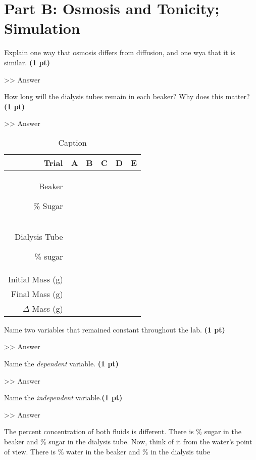 \documentclass[12pt,a4paper]{article}
\begin{document}
\section*{Part B: Osmosis and Tonicity; Simulation}
\begin{enumerate}[font=\bfseries, wide, resume]
    {\color{under}\item Explain one way that osmosis differs from diffusion, and one wya that it is similar. \textbf{(1 pt)}}

    >> Answer

    {\color{under}\item How long will the dialysis tubes remain in each beaker? Why does this matter? \textbf{(1 pt)}}

    >> Answer

    \begin{table}[h]
        \centering
        \caption{Caption}
        \begin{tabular}{r|ccccc}
            \toprule
            Trial & A & B & C & D & E\\
            \midrule
            Beaker \par \% Sugar &&&&\\
            Dialysis Tube\par \% sugar&&&&\\
            Initial Mass (g)&&&&\\
            Final Mass (g) &&&&\\
            $\Delta$ Mass (g)&&&&\\
            \bottomrule
            \end{tabular}
    \end{table}
    

    {\color{under}\item Name two variables that remained constant throughout the lab. \textbf{(1 pt)}}

    >> Answer

    {\color{under}\item Name the \textit{dependent} variable. \textbf{(1 pt)}}

    >> Answer

    {\color{under}\item Name the \textit{independent} variable.\textbf{(1 pt)}}

    >> Answer

    {\color{under} The percent concentration of both fluids is different. There is {\color{darkmodetext}\textbf{}\%} sugar in the beaker and {\color{darkmodetext}\textbf{}\%} sugar in the dialysis tube. Now, think of it from the water's point of  view. There is {\color{darkmodetext}\textbf{}\%} water in the beaker and {\color{darkmodetext}\textbf{}\%} in the dialysis tube}


\end{enumerate}
\end{document}
